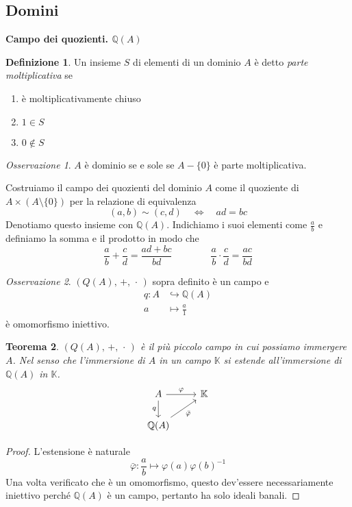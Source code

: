 \documentclass[a4paper]{article}
\newtheorem{theorem}{Teorema}[section]
\theoremstyle{remark}
\newtheorem*{remark}{Osservazione}
\theoremstyle{definition}
\newtheorem{definition}[theorem]{Definizione}
\newcommand{\Q}{\mathbb{Q}}
\newcommand{\K}{\mathbb{K}}
\begin{document}
\subsection{Domini}
\begin{multicols}{2}

\textbf{Campo dei quozienti. $ \Q(A) $}

\begin{definition}
	Un insieme $ S $ di elementi di un dominio $ A $ è detto \emph{parte moltiplicativa} se
	\begin{enumerate}
		\item è moltiplicativamente chiuso
		\item $ 1 \in S $
		\item $ 0 \notin S $
	\end{enumerate}
\end{definition}

\begin{remark}
	$ A $ è dominio se e sole se $ A - \{0\} $ è parte moltiplicativa.
\end{remark}

Costruiamo il campo dei quozienti del dominio $ A $ come il quoziente di $ A \times (A \setminus \{0\}) $ per la relazione di equivalenza $$  (a, b) \sim (c, d) \quad\Leftrightarrow\quad ad = bc $$
Denotiamo questo insieme con $ \Q(A) $. Indichiamo i suoi elementi come $ \frac{a}{b} $ e definiamo la somma e il prodotto in modo che
\[ \frac{a}{b} + \frac{c}{d} = \frac{ad + bc}{bd} \qquad\qquad \frac{a}{b}\cdot \frac{c}{d} = \frac{ac}{bd} \]

\begin{remark}
	$ (Q(A),\, +,\, \cdot\,) $ sopra definito è un campo e
	\begin{align*}
	q \colon A &\hookrightarrow \Q(A) \\
	a &\mapsto \frac{a}{1}
	\end{align*}
	è omomorfismo iniettivo.
\end{remark}

\begin{theorem}
	$ (Q(A),\, +,\, \cdot\,) $ è il più piccolo campo in cui possiamo immergere $ A $. Nel senso che l'immersione di $ A $ in un campo $ \mathbb{K} $ si estende all'immersione di $ \Q(A) $ in $ \mathbb{K} $.
	\[ \begin{tikzcd}
	A \arrow{r}{\varphi} \arrow[swap]{d}{q} & \K \\
	\Q(A) \arrow[swap]{ru}{\bar{\varphi}}
	\end{tikzcd} \]
\end{theorem}
\begin{proof}
	L'estensione è naturale
	\[ \bar{\varphi}: \frac{a}{b} \mapsto \varphi(a) \varphi(b)^{-1} \]
	Una volta verificato che è un omomorfismo, questo dev'essere necessariamente iniettivo perché $ \Q(A) $ è un campo, pertanto ha solo ideali banali.
\end{proof}


\end{multicols}
\end{document}
